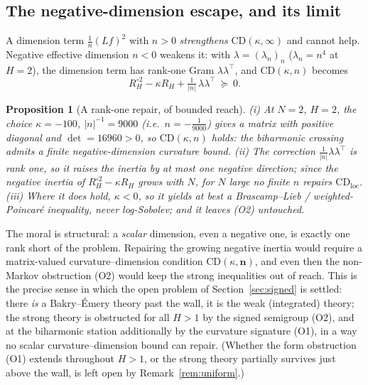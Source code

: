 \documentclass[11pt,reqno]{amsart}
\theoremstyle{plain}
\newtheorem{proposition}[theorem]{Proposition}
\theoremstyle{definition}
\newcommand{\Had}{\mathbin{\circ}}
\begin{document}
\subsection{The negative-dimension escape, and its limit}
A dimension term $\tfrac1n(Lf)^2$ with $n>0$ \emph{strengthens}
$\mathrm{CD}(\kappa,\infty)$ and cannot help. Negative effective dimension $n<0$
weakens it: with $\lambda=(\lambda_n)_n$ ($\lambda_n=n^4$ at $H=2$), the dimension
term has rank-one Gram $\lambda\lambda^\top$, and $\mathrm{CD}(\kappa,n)$ becomes
\[
  R_H^{\Had2}-\kappa R_H+\tfrac1{|n|}\,\lambda\lambda^\top\ \succeq\ 0 .
\]

\begin{proposition}[A rank-one repair, of bounded reach]\label{prop:dim}
\textup{(i)} At $N=2$, $H=2$, the choice $\kappa=-100$, $|n|^{-1}=9000$
\textup(i.e.\ $n=-\tfrac1{9000}$\textup) gives a matrix with positive diagonal and
$\det=16960>0$, so $\mathrm{CD}(\kappa,n)$ holds: the biharmonic crossing admits a
finite negative-dimension curvature bound.
\textup{(ii)} The correction $\tfrac1{|n|}\lambda\lambda^\top$ is rank one, so it
raises the inertia by at most one negative direction; since the negative inertia
of $R_H^{\Had2}-\kappa R_H$ grows with $N$, for $N$ large \emph{no} finite $n$
repairs $\mathrm{CD}_{\mathrm{loc}}$.
\textup{(iii)} Where it does hold, $\kappa<0$, so it yields at best a
Brascamp--Lieb / weighted-Poincar\'e inequality, never log-Sobolev; and it leaves
\textup{(O2)} untouched.
\end{proposition}

The moral is structural: a \emph{scalar} dimension, even a negative one, is
exactly one rank short of the problem. Repairing the growing negative inertia
would require a matrix-valued curvature--dimension condition
$\mathrm{CD}(\kappa,\mathbf n)$, and even then the non-Markov obstruction (O2)
would keep the strong inequalities out of reach. This is the precise sense in
which the open problem of Section~\ref{sec:signed} is settled: there \emph{is} a
Bakry--\'Emery theory past the wall, it is the weak (integrated) theory; the
strong theory is obstructed for all $H>1$ by the signed semigroup (O2), and at the
biharmonic station additionally by the curvature signature (O1), in a way no
scalar curvature--dimension bound can repair. (Whether the form obstruction (O1)
extends throughout $H>1$, or the strong theory partially survives just above the
wall, is left open by Remark~\ref{rem:uniform}.)

\end{document}
